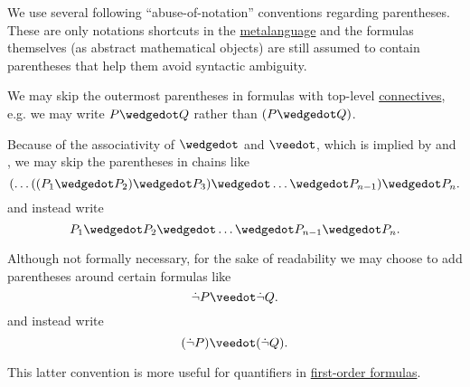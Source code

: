 \begin{remark}\label{rem:propositional_formula_parentheses}
  We use several following \enquote{abuse-of-notation} conventions regarding parentheses. These are only notations shortcuts in the \hyperref[con:metalogic]{metalanguage} and the formulas themselves (as abstract mathematical objects) are still assumed to contain parentheses that help them avoid syntactic ambiguity.

  \begin{thmenum}
     We may skip the outermost parentheses in formulas with top-level \hyperref[def:propositional_alphabet/connectives]{connectives}, e.g. we may write \( P \synwedge Q \) rather than \( (P \synwedge Q) \).

     Because of the associativity of \( \synwedge \) and \( \synvee \), which is implied by  and , we may skip the parentheses in chains like
    \begin{equation*}
      ( \ldots ((P_1 \synwedge P_2) \synwedge P_3) \synwedge \ldots \synwedge P_{n-1} ) \synwedge P_n.
    \end{equation*}
    and instead write
    \begin{equation*}
      P_1 \synwedge P_2 \synwedge \ldots \synwedge P_{n-1} \synwedge P_n.
    \end{equation*}

     Although not formally necessary, for the sake of readability we may choose to add parentheses around certain formulas like
    \begin{equation*}
      \synneg P \synvee \synneg Q.
    \end{equation*}
    and instead write
    \begin{equation*}
      (\synneg P) \synvee (\synneg Q).
    \end{equation*}

    This latter convention is more useful for quantifiers in \hyperref[def:first_order_syntax/formula]{first-order formulas}.
  \end{thmenum}
\end{remark}

